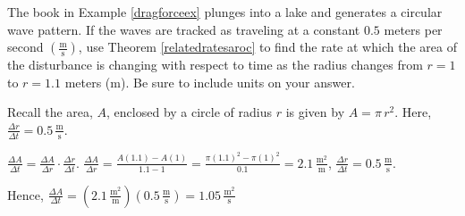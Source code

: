 \documentclass{ximera}
\begin{document}
\begin{problem}
The book in Example \ref{dragforceex} plunges into a lake and generates a circular wave pattern.  If the waves are tracked as traveling at a constant $0.5$ meters per second $\left( \frac{\text{m}}{\text{s}}\right)$, use Theorem \ref{relatedratesaroc} to find the rate at which the area of the disturbance is changing with respect to time as the radius changes from $r = 1$ to $r = 1.1$ meters (m).  Be sure to include units on your answer.


\begin{hint}
Recall the area, $A$, enclosed by a circle of radius $r$ is given by $A = \pi \, r^2$.  Here, $\frac{\Delta r}{\Delta t} = 0.5 \, \frac{\text{m}}{\text{s}}$.
\end{hint}

\begin{solution}
    
$\frac{\Delta A}{\Delta t} = \frac{\Delta A}{\Delta r} \cdot \frac{\Delta r}{\Delta t}$.  $\frac{\Delta A}{\Delta r} = \frac{A(1.1) - A(1)}{1.1-1} = \frac{\pi (1.1)^2 - \pi (1)^2}{0.1} = 2.1 \, \frac{\text{m}^2}{\text{m}}$,  $\frac{\Delta r}{\Delta t} = 0.5 \, \frac{\text{m}}{\text{s}}$.

Hence,  $\frac{\Delta A}{\Delta t} = \left( 2.1 \, \frac{\text{m}^2}{\text{m}} \right) \left(0.5 \, \frac{\text{m}}{\text{s}} \right) = 1.05 \,  \frac{\text{m}^2}{\text{s}}$
\end{solution}
\end{problem}
\end{document}
